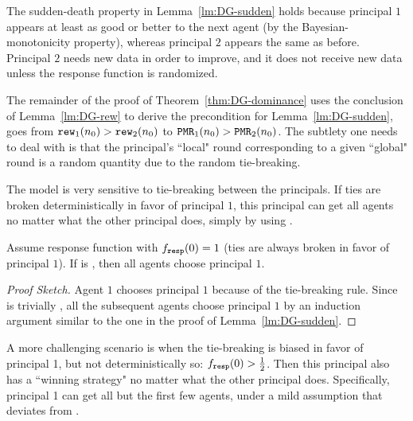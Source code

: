 The sudden-death property in Lemma~\ref{lm:DG-sudden} holds because principal $1$ appears at least as good or better to the next agent (by the Bayesian-monotonicity property), whereas principal $2$ appears the same as before. Principal $2$ needs new data in order to improve, and it does not receive new data unless the response function is randomized.

The remainder of the proof of Theorem~\ref{thm:DG-dominance} uses the conclusion of Lemma~\ref{lm:DG-rew} to derive the precondition for Lemma~\ref{lm:DG-sudden}, \ie goes from $\mathtt{rew}_1(n_0)>\mathtt{rew}_2(n_0)$ to $\mathtt{PMR}_1(n_0)>\mathtt{PMR}_2(n_0)$. The subtlety one needs to deal with is that the principal's ``local" round corresponding to a given ``global" round is a random quantity due to the random tie-breaking.


The \HardMax model is very sensitive to tie-breaking between the principals.
If ties are  broken deterministically in favor of principal $1$, this principal can get all agents no matter what the other principal does, simply by using \StaticGreedy.

\begin{theorem}\label{thm:HardMax-hardTies}
Assume \HardMax response function with $f_{\mathtt{resp}}(0)=1$ (ties are always broken in favor of principal $1$). If \alg[1] is \StaticGreedy, then all agents choose principal $1$.
\end{theorem}

\begin{proof}[Proof Sketch]
Agent $1$ chooses principal $1$ because of the tie-breaking rule. Since \StaticGreedy is trivially \bmonotone, all the subsequent agents choose principal $1$ by an induction argument similar to the one in the proof of Lemma~\ref{lm:DG-sudden}.
\end{proof}



A more challenging scenario is when the tie-breaking is biased in favor of principal 1, but not deterministically so: $f_{\mathtt{resp}}(0)>\tfrac12$. Then this principal also has a ``winning strategy" no matter what the other principal does. Specifically, principal 1 can get all but the first few agents, under a mild assumption that \DynGreedy deviates from \StaticGreedy.

